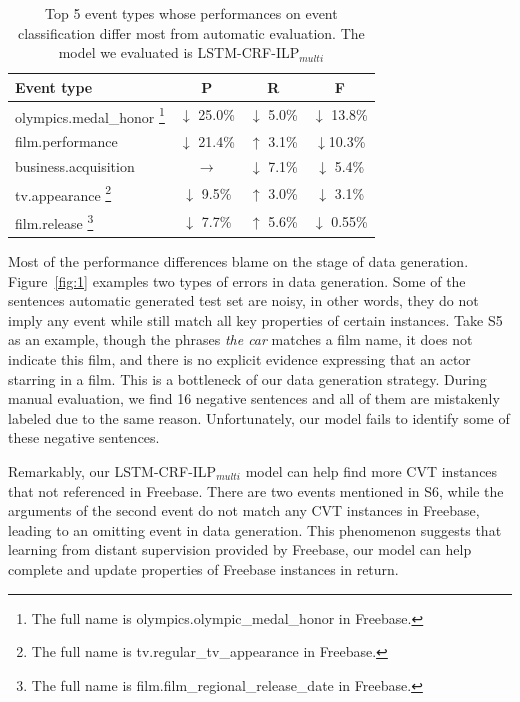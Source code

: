 \documentclass{article}
\begin{document}
\begin{table}[h]
\small
\centering
\begin{tabular}{|l|c|c|c|} \hline
	Event type & P & R & F \\ \hline
	olympics.medal\_honor \footnote{The full name is olympics.olympic\_medal\_honor in Freebase.} & $\downarrow$ 25.0\% & $\downarrow$ 5.0\% & $\downarrow$ 13.8\% \\ \hline
	film.performance & $\downarrow$ 21.4\% & $\uparrow$ 3.1\% & $\downarrow$10.3\% \\ \hline
	business.acquisition & $\rightarrow$ & $\downarrow$ 7.1\% & $\downarrow$ 5.4\% \\ \hline
	tv.appearance \footnote{The full name is tv.regular\_tv\_appearance in Freebase.} & $\downarrow$ 9.5\% & $\uparrow$ 3.0\% & $\downarrow$ 3.1\% \\ \hline
	film.release \footnote{The full name is film.film\_regional\_release\_date in Freebase.} & $\downarrow$ 7.7\% & $\uparrow$ 5.6\% & $\downarrow$ 0.55\% \\ \hline
\end{tabular}
\caption{Top 5 event types whose performances on event classification differ most from automatic evaluation. The model we evaluated is LSTM-CRF-ILP$_{multi}$ \label{tab:4}}
\end{table}

Most of the performance differences blame on the stage of data generation. Figure~\ref{fig:1} examples two types of errors in data generation. Some of the sentences automatic generated test set are noisy, in other words, they do not imply any event while still match all key properties of certain instances. Take S5 as an example, though the phrases \emph{the car} matches a film name, it does not indicate this film, and there is no explicit evidence expressing that an actor starring in a film. This is a bottleneck of our data generation strategy. During manual evaluation, we find 16 negative sentences and all of them are mistakenly labeled due to the same reason. Unfortunately, our model fails to identify some of these negative sentences.

Remarkably, our LSTM-CRF-ILP$_{multi}$ model can help find more CVT instances that not referenced in Freebase. There are two events mentioned in S6, while the arguments of the second event do not match any CVT instances in Freebase, leading to an omitting event in data generation. This phenomenon suggests that learning from distant supervision provided by Freebase, our model can help complete and update properties of Freebase instances in return.
\end{document}
